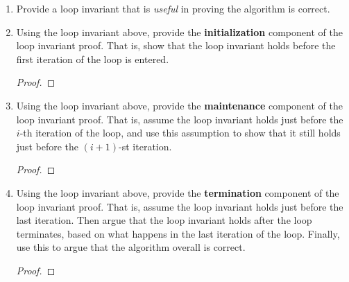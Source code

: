 \documentclass[12pt]{article}
\theoremstyle{definition}
\theoremstyle{definition}
\theoremstyle{definition}
\begin{document}
\begin{enumerate}[label=(\alph*)]
\item Provide a loop invariant that is \textit{useful} in proving the algorithm is correct. 


\vskip 80pt
\item Using the loop invariant above, provide the \textbf{initialization} component of the loop invariant proof. That is, show that the loop invariant holds before the first iteration of the loop is entered.

\begin{proof}
\end{proof}

\newpage
    \item Using the loop invariant above, provide the \textbf{maintenance} component of the loop invariant proof. That is, assume the loop invariant holds just before the $i$-th iteration of the loop, and use this assumption to show that it still holds just before the $(i+1)$-st iteration.

\begin{proof}
\end{proof}
    
    \vskip 220pt
    \item Using the loop invariant above, provide the \textbf{termination} component of the loop invariant proof. That is, assume the loop invariant holds just before the last iteration. Then argue that the loop invariant holds after the loop terminates, based on what happens in the last iteration of the loop. Finally, use this to argue that the algorithm overall is correct.

\begin{proof}
\end{proof}


\end{enumerate}
\end{document}
